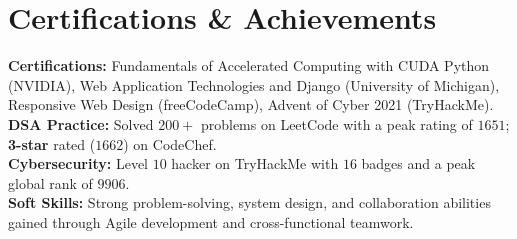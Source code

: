 \documentclass[letterpaper,11pt]{article}
\begin{document}

\section{Certifications \& Achievements}
 \begin{itemize}[leftmargin=0.15in, label={}]
    \small{\item{
      \textbf{Certifications:} Fundamentals of Accelerated Computing with CUDA Python (NVIDIA), Web Application Technologies and Django (University of Michigan), Responsive Web Design (freeCodeCamp), Advent of Cyber 2021 (TryHackMe). \\[3pt]
      \textbf{DSA Practice:} Solved $200+$ problems on LeetCode with a peak rating of $1651$; \textbf{3-star} rated ($1662$) on CodeChef. \\[3pt]
      \textbf{Cybersecurity:} Level $10$ hacker on TryHackMe with $16$ badges and a peak global rank of $9906$. \\[3pt]
      \textbf{Soft Skills:} Strong problem-solving, system design, and collaboration abilities gained through Agile development and cross-functional teamwork.
    }}
 \end{itemize}
\end{document}
